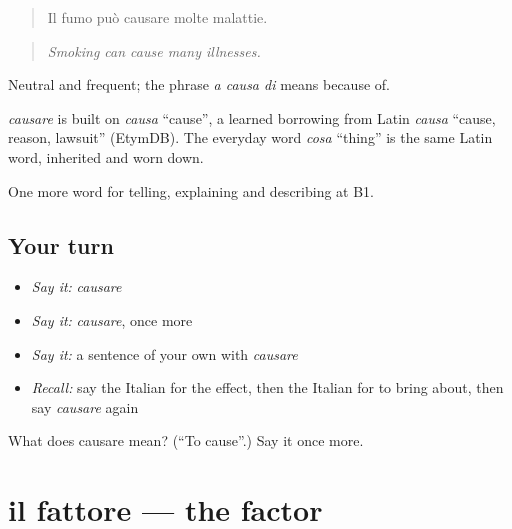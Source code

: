 \begin{quote}
Il fumo può causare molte malattie.
\end{quote}

\begin{quote}
\emph{Smoking can cause many illnesses.}
\end{quote}

Neutral and frequent; the phrase \emph{a causa di} means because of.

\begin{cousinweb}
\emph{causare} is built on \emph{causa} \textquotedblleft{}cause\textquotedblright{}, a learned borrowing from Latin \emph{causa} \textquotedblleft{}cause, reason, lawsuit\textquotedblright{} (EtymDB). The everyday word \emph{cosa} \textquotedblleft{}thing\textquotedblright{} is the same Latin word, inherited and worn down.
\end{cousinweb}

\begin{grammarlens}[title={What you've built}]
One more word for telling, explaining and describing at B1.
\end{grammarlens}

\subsection*{Your turn}
\begin{itemize}
\raggedright
  \item \emph{Say it:} \emph{causare}
  \item \emph{Say it:} \emph{causare}, once more
  \item \emph{Say it:} a sentence of your own with \emph{causare}
  \item \emph{Recall:} say the Italian for the effect, then the Italian for to bring about, then say \emph{causare} again
\end{itemize}

\begin{tcolorbox}[breakable,colback=teal!4,colframe=teal!35!black,title={Before you move on}]
What does causare mean? (\textquotedblleft{}To cause\textquotedblright{}.) Say it once more.
\end{tcolorbox}
\section[il fattore]{il fattore — the factor}

\label{lesson:IT-C349-fattore}



